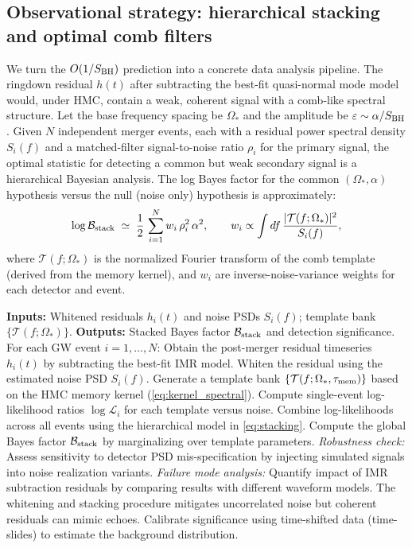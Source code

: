 \documentclass[a4paper,11pt]{article}
\newcommand{\HMC}{\textup{\textsc{HMC}}\xspace}
\theoremstyle{plain}
\theoremstyle{definition}
\theoremstyle{remark}
\begin{document}
\subsection{Observational strategy: hierarchical stacking and optimal comb filters}
\label{ssec:obs}
We turn the $O(1/S_{\rm BH})$ prediction into a concrete data analysis pipeline. The ringdown residual $h(t)$ after subtracting the best-fit quasi-normal mode model would, under \HMC{}, contain a weak, coherent signal with a comb-like spectral structure. Let the base frequency spacing be $\Omega_\ast$ and the amplitude be $\varepsilon\sim \alpha/S_{\rm BH}$. Given $N$ independent merger events, each with a residual power spectral density $S_i(f)$ and a matched-filter signal-to-noise ratio $\rho_i$ for the primary signal, the optimal statistic for detecting a common but weak secondary signal is a hierarchical Bayesian analysis. The log Bayes factor for the common $(\Omega_\ast,\alpha)$ hypothesis versus the null (noise only) hypothesis is approximately:
\begin{equation}
\log \mathcal{B}_{\rm stack}\;\simeq\; \frac{1}{2}\,\sum_{i=1}^N w_i\, \rho_i^2\,\alpha^2,
\qquad
w_i \propto \int df\,\frac{|\mathcal{T}(f;\Omega_\ast)|^2}{S_i(f)},
\label{eq:stacking}
\end{equation}
where $\mathcal{T}(f;\Omega_\ast)$ is the normalized Fourier transform of the comb template (derived from the memory kernel), and $w_i$ are inverse-noise-variance weights for each detector and event.

\begin{algorithm}[tbp]
\caption{Comb matched-filter search for \HMC{} echoes.}
\label{alg:combfilter}
\begin{algorithmic}[1]
\State \textbf{Inputs:} Whitened residuals $h_i(t)$ and noise PSDs $S_i(f)$; template bank $\{\mathcal{T}(f;\Omega_\ast)\}$.
\State \textbf{Outputs:} Stacked Bayes factor $\mathcal{B}_{\rm stack}$ and detection significance.
\State For each GW event $i=1,\dots,N$:
\State \quad Obtain the post-merger residual timeseries $h_i(t)$ by subtracting the best-fit IMR model.
\State \quad Whiten the residual using the estimated noise PSD $S_i(f)$.
\State \quad Generate a template bank $\{\mathcal{T}(f;\Omega_\ast, \tau_{\rm mem})\}$ based on the \HMC{} memory kernel (\eqref{eq:kernel_spectral}).
\State \quad Compute single-event log-likelihood ratios $\log\mathcal{L}_i$ for each template versus noise.
\State Combine log-likelihoods across all events using the hierarchical model in \eqref{eq:stacking}.
\State Compute the global Bayes factor $\mathcal{B}_{\rm stack}$ by marginalizing over template parameters.
\State \quad \textit{Robustness check:} Assess sensitivity to detector PSD mis-specification by injecting simulated signals into noise realization variants.
\State \quad \textit{Failure mode analysis:} Quantify impact of IMR subtraction residuals by comparing results with different waveform models. The whitening and stacking procedure mitigates uncorrelated noise but coherent residuals can mimic echoes.
\State Calibrate significance using time-shifted data (time-slides) to estimate the background distribution.
\end{algorithmic}
\end{algorithm}
\end{document}
